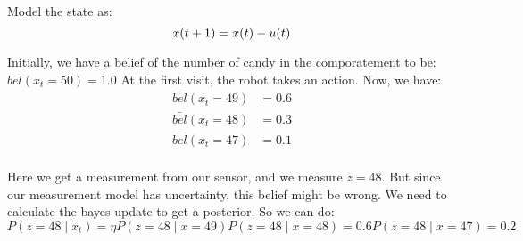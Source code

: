 \documentclass[14pt,letterpaper]{article}
\theoremstyle{definition}
\begin{document}
Model the state as:
\begin{equation}
  x(t+1) = x(t) - u(t) \\
  \label{eq:State Model}
\end{equation}

Initially, we have a belief of the number of candy in the comporatement to be: $bel(x_t=50) = 1.0$
At the first visit, the robot takes an action. Now, we have:
\begin{align*}
  \bar{bel}(x_t=49) &= 0.6 \\
  \bar{bel}(x_t=48) &= 0.3 \\
  \bar{bel}(x_t=47) &= 0.1 \\
\end{align*}

Here we get a measurement from our sensor, and we measure $z = 48$. But since our measurement model has uncertainty, this belief might be wrong.
We need to calculate the bayes update to get a posterior. So we can do:
\begin{equation}
  P(z=48 \mid x_t) = \eta P(z=48 \mid x=49)
  P(z=48 \mid x=48) = 0.6
  P(z=48 \mid x=47) = 0.2
  \label{eq:}
\end{equation}

%
%
%
%
%
%
%
%
%
%
%
\end{document}
